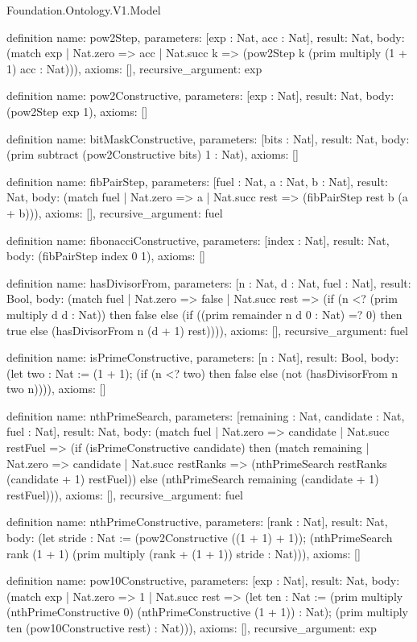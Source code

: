 \begin{lexlean}{Foundation.Ontology.V1.Model}
\begin{semanticmodule}
definition{
  name: pow2Step,
  parameters: [exp : Nat, acc : Nat],
  result: Nat,
  body: (match exp
    | Nat.zero => acc
    | Nat.succ k => (pow2Step k (prim multiply (1 + 1) acc : Nat))),
  axioms: [],
  recursive_argument: exp
}

definition{
  name: pow2Constructive,
  parameters: [exp : Nat],
  result: Nat,
  body: (pow2Step exp 1),
  axioms: []
}

definition{
  name: bitMaskConstructive,
  parameters: [bits : Nat],
  result: Nat,
  body: (prim subtract (pow2Constructive bits) 1 : Nat),
  axioms: []
}

definition{
  name: fibPairStep,
  parameters: [fuel : Nat, a : Nat, b : Nat],
  result: Nat,
  body: (match fuel | Nat.zero => a | Nat.succ rest => (fibPairStep rest b (a + b))),
  axioms: [],
  recursive_argument: fuel
}

definition{
  name: fibonacciConstructive,
  parameters: [index : Nat],
  result: Nat,
  body: (fibPairStep index 0 1),
  axioms: []
}

definition{
  name: hasDivisorFrom,
  parameters: [n : Nat, d : Nat, fuel : Nat],
  result: Bool,
  body: (match fuel
    | Nat.zero => false
    | Nat.succ rest => (if (n <? (prim multiply d d : Nat)) then false else (if ((prim remainder n d 0 : Nat) =? 0) then true else (hasDivisorFrom n (d + 1) rest)))),
  axioms: [],
  recursive_argument: fuel
}

definition{
  name: isPrimeConstructive,
  parameters: [n : Nat],
  result: Bool,
  body: (let two : Nat := (1 + 1); (if (n <? two) then false else (not (hasDivisorFrom n two n)))),
  axioms: []
}

definition{
  name: nthPrimeSearch,
  parameters: [remaining : Nat, candidate : Nat, fuel : Nat],
  result: Nat,
  body: (match fuel
    | Nat.zero => candidate
    | Nat.succ restFuel => (if (isPrimeConstructive candidate) then (match remaining
      | Nat.zero => candidate
      | Nat.succ restRanks => (nthPrimeSearch restRanks (candidate + 1) restFuel)) else (nthPrimeSearch remaining (candidate + 1) restFuel))),
  axioms: [],
  recursive_argument: fuel
}

definition{
  name: nthPrimeConstructive,
  parameters: [rank : Nat],
  result: Nat,
  body: (let stride : Nat := (pow2Constructive ((1 + 1) + 1)); (nthPrimeSearch rank (1 + 1) (prim multiply (rank + (1 + 1)) stride : Nat))),
  axioms: []
}

definition{
  name: pow10Constructive,
  parameters: [exp : Nat],
  result: Nat,
  body: (match exp
    | Nat.zero => 1
    | Nat.succ rest => (let ten : Nat := (prim multiply (nthPrimeConstructive 0) (nthPrimeConstructive (1 + 1)) : Nat); (prim multiply ten (pow10Constructive rest) : Nat))),
  axioms: [],
  recursive_argument: exp
}


\end{semanticmodule}
\end{lexlean}
